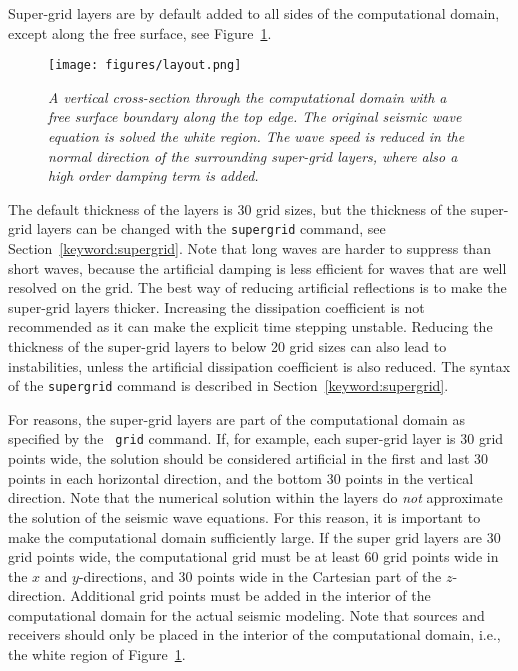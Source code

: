 \documentclass[11pt]{report}
\begin{document}
Super-grid layers are by default added to all sides of the computational domain, except along the
free surface, see Figure~\ref{fig:layout}.
\begin{figure}[t]
\begin{center}
\texttt{[image: figures/layout.png]}
\caption{\em A vertical cross-section through the computational domain with a free surface boundary
  along the top edge. The original seismic wave equation is solved the white region. The wave speed
  is reduced in the normal direction of the surrounding super-grid layers, where also a high order
  damping term is added.}\label{fig:layout}
\end{center}
\end{figure}
The default thickness of the layers is 30 grid sizes, but the thickness of the super-grid layers can
be changed with the {\tt supergrid} command, see Section~\ref{keyword:supergrid}. Note that long
waves are harder to suppress than short waves, because the artificial damping is less efficient for
waves that are well resolved on the grid. The best way of reducing artificial reflections is to make
the super-grid layers thicker. Increasing the dissipation coefficient is not recommended as it can
make the explicit time stepping unstable. Reducing the thickness of the super-grid layers to below
20 grid sizes can also lead to instabilities, unless the artificial dissipation coefficient is also
reduced. The syntax of the {\tt supergrid} command is described in Section~\ref{keyword:supergrid}.

For reasons, the super-grid layers are part of the computational domain as specified by the {\tt
  grid} command. If, for example, each super-grid layer is 30 grid points wide, the solution should
be considered artificial in the first and last 30 points in each horizontal direction, and the
bottom 30 points in the vertical direction. Note that the numerical solution within the layers do
{\em not} approximate the solution of the seismic wave equations. For this reason, it is important
to make the computational domain sufficiently large. If the super grid layers are 30 grid points
wide, the computational grid must be at least 60 grid points wide in the $x$ and $y$-directions, and
30 points wide in the Cartesian part of the $z$-direction. Additional grid points must be added in
the interior of the computational domain for the actual seismic modeling. Note that sources and
receivers should only be placed in the interior of the computational domain, i.e., the white region
of Figure~\ref{fig:layout}.
\end{document}
